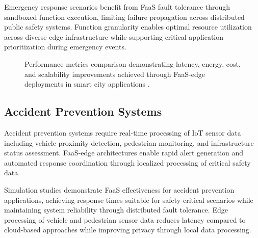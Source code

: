 Emergency response scenarios benefit from FaaS fault tolerance through sandboxed function execution, limiting failure propagation across distributed public safety systems. Function granularity enables optimal resource utilization across diverse edge infrastructure while supporting critical application prioritization during emergency events.

\begin{figure}[htbp]
\centering
{}
\caption{Performance metrics comparison demonstrating latency, energy, cost, and scalability improvements achieved through FaaS-edge deployments in smart city applications \cite{wang2021edgeserve, das2022serverlesssimpro, li2022edgefaas}.}
\label{fig:performance-comparison}
\end{figure}


\subsection{Accident Prevention Systems}

Accident prevention systems require real-time processing of IoT sensor data including vehicle proximity detection, pedestrian monitoring, and infrastructure status assessment. FaaS-edge architectures enable rapid alert generation and automated response coordination through localized processing of critical safety data.

Simulation studies demonstrate FaaS effectiveness for accident prevention applications, achieving response times suitable for safety-critical scenarios while maintaining system reliability through distributed fault tolerance. Edge processing of vehicle and pedestrian sensor data reduces latency compared to cloud-based approaches while improving privacy through local data processing.

